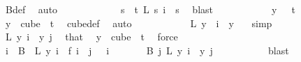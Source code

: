 \begin{isabellebody}
\ B{\isacharunderscore}{\kern0pt}def\ \isamarkupfalse%
\ auto\ \isanewline
\ \ \ \ \ \ \ \ \isamarkupfalse%
\ \isamarkupfalse%
\ {\isachardoublequoteopen}{\isacharparenleft}{\kern0pt}{\isasymforall}s\ {\isacharless}{\kern0pt}\ t{\isachardot}{\kern0pt}\ L\ s\ i\ {\isacharequal}{\kern0pt}\ s{\isacharparenright}{\kern0pt}{\isachardoublequoteclose}\ \isamarkupfalse%
\ blast\isanewline
\ \ \ \ \ \ \ \ \isamarkupfalse%
\ \isamarkupfalse%
\ {\isachardoublequoteopen}y\ {}\ {\isacharless}{\kern0pt}\ t{\isachardoublequoteclose}\ \isamarkupfalse%
\ {\isacartoucheopen}y\ {\isasymin}\ cube\ {}\ t{\isacartoucheclose}\ \isamarkupfalse%
\ cube{\isacharunderscore}{\kern0pt}def\ \isamarkupfalse%
\ auto\isanewline
\ \ \ \ \ \ \ \ \isamarkupfalse%
\ \isamarkupfalse%
\ {\isachardoublequoteopen}L\ {\isacharparenleft}{\kern0pt}y\ {}{\isacharparenright}{\kern0pt}\ i\ {\isacharequal}{\kern0pt}\ y\ {}{\isachardoublequoteclose}\ \isamarkupfalse%
\ simp\isanewline
\ \ \ \ \ \ \ \ \isamarkupfalse%
\ \isamarkupfalse%
\ {\isachardoublequoteopen}{\isacharquery}{\kern0pt}L\ y\ i\ {\isacharequal}{\kern0pt}\ y\ j{\isachardoublequoteclose}\ \isamarkupfalse%
\ that\ \isamarkupfalse%
\ {\isacartoucheopen}y\ {\isasymin}\ cube\ {}\ t{\isacartoucheclose}\ \isamarkupfalse%
\ force\isanewline
\ \ \ \ \ \ \isamarkupfalse%
\isanewline
\isanewline
\ \ \ \ \ \ \isamarkupfalse%
\ \isamarkupfalse%
\ {\isachardoublequoteopen}{\isacharparenleft}{\kern0pt}{\isasymforall}i\ {\isasymin}\ B\ {}{\isachardot}{\kern0pt}\ {\isacharquery}{\kern0pt}L\ y\ i\ {\isacharequal}{\kern0pt}\ {\isacharquery}{\kern0pt}f\ i{\isacharparenright}{\kern0pt}\ {\isasymand}\ {\isacharparenleft}{\kern0pt}{\isasymforall}j\ {\isacharless}{\kern0pt}\ {}{\isachardot}{\kern0pt}\ {\isasymforall}i\isanewline
\ \ \ \ \ \ {\isasymin}\ B\ j{\isachardot}{\kern0pt}\ {\isacharparenleft}{\kern0pt}{\isacharquery}{\kern0pt}L\ y{\isacharparenright}{\kern0pt}\ i\ {\isacharequal}{\kern0pt}\ y\ j{\isacharparenright}{\kern0pt}{\isachardoublequoteclose}\ \isanewline
\ \ \ \ \ \ \ \ \isamarkupfalse%
\ blast\isanewline
\ \ \ \ \isamarkupfalse%
\isanewline
\ \ \isacommand{{\isacharbraceright}{\kern0pt}}\isamarkupfalse%

\end{isabellebody}
